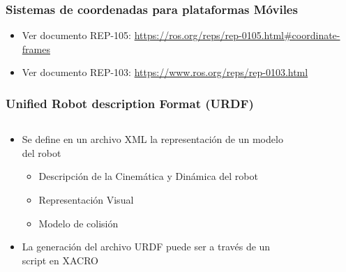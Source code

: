 \begin{frame}[fragile]
    \frametitle{Sistemas de coordenadas para plataformas Móviles}
    \begin{itemize}
        \item Ver documento REP-105: \url{https://ros.org/reps/rep-0105.html#coordinate-frames}
        
        \item Ver documento REP-103: \url{https://www.ros.org/reps/rep-0103.html}
    \end{itemize}
    
\end{frame}


\begin{frame}
	\frametitle{Unified Robot description Format (URDF)}
 	\begin{columns}
		\begin{column}{0.5\textwidth}
			\begin{itemize}
				\item Se define en un archivo XML la representación de un modelo del robot
				\begin{itemize}
					\item Descripción de la Cinemática y Dinámica del robot
					\item Representación Visual
					\item Modelo de colisión
				\end{itemize}
				\item La generación del archivo URDF puede ser a través de un script en XACRO
			\end{itemize}
		\end{column}
		\begin{column}{0.5\textwidth}
			\begin{figure}[!h]
			\centering
			\end{figure}
		\end{column}
	\end{columns}
	
\end{frame}

